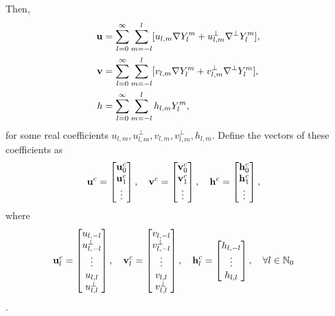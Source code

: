 \documentclass[11pt, oneside]{article}   	%
\newcommand{\No}{\mathbb{N}_0}
\newcommand{\Ylm}{Y^m_l}
\newcommand{\gradYlm}{\nabla Y^m_l}
\newcommand{\gradpYlm}{\nabla^\perp Y^m_l}
\begin{document}
Then, 
\begin{align}
\bold{u} &= \sum_{l=0}^{\infty} \sum_{m=-l}^{l} [ u_{l,m} \gradYlm + u^{\perp}_{l,m} \gradpYlm ], \\
\bold{v} &= \sum_{l=0}^{\infty} \sum_{m=-l}^{l} [ v_{l,m} \gradYlm + v^{\perp}_{l,m} \gradpYlm ], \\
h &= \sum_{l=0}^{\infty} \sum_{m=-l}^{l} h_{l,m} \Ylm,
\end{align}
for some real coefficients \(u_{l,m}, u^{\perp}_{l,m}, v_{l,m}, v^{\perp}_{l,m}, h_{l,m}\). Define the vectors of these coefficients as 
\begin{align}
\bold{u}^c &= \begin{bmatrix}
			\bold{u}_0^c \\
			\bold{u}_1^c \\
			\vdots \\
		    \end{bmatrix},
\quad
\bold{v}^c = \begin{bmatrix}
			\bold{v}_0^c \\
			\bold{v}_1^c \\
			\vdots \\
		    \end{bmatrix},
\quad
\bold{h}^c = \begin{bmatrix}
			\bold{h}_0^c \\
			\bold{h}_1^c \\
			\vdots \\
		    \end{bmatrix},		  
\end{align}
where
\begin{align}
\bold{u}^c_l &= \begin{bmatrix}
				u_{l,-l} \\
				u^{\perp}_{l,-l} \\
				\vdots \\
				u_{l,l} \\
				u^{\perp}_{l,l}
		        \end{bmatrix},
\quad
\bold{v}^c_l = \begin{bmatrix}
				v_{l,-l} \\
				v^{\perp}_{l,-l} \\
				\vdots \\
				v_{l,l} \\
				v^{\perp}_{l,l}
		        \end{bmatrix},
\quad
\bold{h}^c_l = \begin{bmatrix}
				h_{l,-l} \\
				\vdots \\
				h_{l,l} \\
		        \end{bmatrix},
\quad \forall l \in \No	  
\end{align}.
\end{document}
